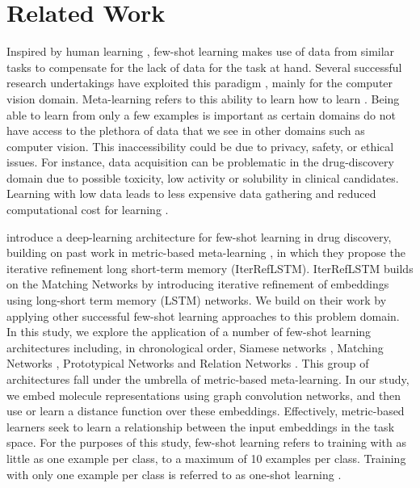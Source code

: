 \documentclass[journal=acscii,manuscript=article]{achemso}
\begin{document}
\section{Related Work}

Inspired by human learning \cite{lake2015human}, few-shot learning makes use of data from similar tasks to compensate for the lack of data for the task at hand. Several successful research undertakings have exploited this paradigm \cite{koch2015siamese, vinyals2016matching, snell2017prototypical, sung2018learning}, mainly for the computer vision domain. Meta-learning refers to this ability to learn how to learn \cite{thrun2012learning, finn2017model}. Being able to learn from only a few examples is important as certain domains do not have access to the plethora of data that we see in other domains such as computer vision. This inaccessibility could be due to privacy, safety, or ethical issues. For instance, data acquisition can be problematic in the drug-discovery domain due to possible toxicity, low activity or solubility in clinical candidates. Learning with low data leads to less expensive data gathering and reduced computational cost for learning \cite{wang2020generalizing}.

\citet{altae2017low} introduce a deep-learning architecture for few-shot learning in drug discovery, building on past work in metric-based meta-learning \cite{vinyals2016matching}, in which they propose the iterative refinement long short-term memory (IterRefLSTM). IterRefLSTM builds on the Matching Networks \cite{vinyals2016matching} by introducing iterative refinement of embeddings using long-short term memory (LSTM) networks. We build on their work by applying other successful few-shot learning approaches to this problem domain. In this study, we explore the application of a number of few-shot learning architectures including, in chronological order, Siamese networks \citep{koch2015siamese}, Matching Networks \citep{vinyals2016matching}, Prototypical Networks \citep{snell2017prototypical} and Relation Networks \citep{sung2018learning}. This group of architectures fall under the umbrella of metric-based meta-learning. In our study, we embed molecule representations using graph convolution networks, and then use or learn a distance function over these embeddings. Effectively, metric-based learners seek to learn a relationship between the input embeddings in the task space. For the purposes of this study, few-shot learning refers to training with as little as one example per class, to a maximum of 10 examples per class. Training with only one example per class is referred to as one-shot learning \citep{koch2015siamese, vinyals2016matching}.
\end{document}

